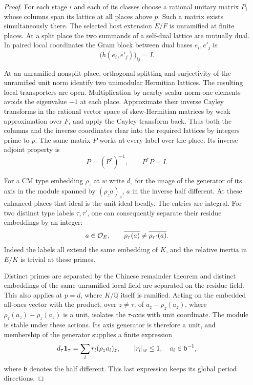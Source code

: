 \begin{proof}

For each stage \(i\) and each of its classes choose a rational
unitary matrix \(P_i\) whose columns span its lattice at all
places above \(p\). Such a matrix exists simultaneously there.
The selected host extension \(E/F\) is unramified at finite places.
At a split place the two summands of a self-dual lattice are
mutually dual.
In paired local coordinates the Gram block between dual bases \(e_i,e'_j\) is
\[
  \big(h(e_i,e'_j)\big)_{ij}=I .
\]

At an unramified nonsplit place, orthogonal
splitting and surjectivity of the unramified unit norm identify
two unimodular Hermitian lattices. The resulting local
transporters are open. Multiplication by nearby scalar norm-one
elements avoids the eigenvalue \(-1\) at each place. Approximate
their inverse Cayley transforms in the rational vector space of
skew-Hermitian matrices by weak approximation over \(F\), and
apply the Cayley transform back. Thus both the columns and the
inverse coordinates clear into the required lattices by
integers prime to \(p\). The same matrix \(P\) works at every label over the place. Its inverse adjoint property is
\[
  P=(P^*)^{-1},\qquad P^*P=I.
\]


For a CM type embedding \(\rho_\tau\) at \(w\) write \(d_\tau\)
for the image of the generator of its axis in the module
spanned by \((\rho_z a)_z\), \(a\) in the inverse half different.
At these enhanced places that ideal is the unit ideal locally.
The entries are integral. For two distinct type labels \(\tau,\tau'\), one can consequently separate their residue embeddings by an integer:
\[
  a\in{\cal O}_E,\qquad \overline{\rho_\tau(a)}\ne\overline{\rho_{\tau'}(a)}.
\]
 Indeed the labels
all extend the same embedding of \(K\), and the relative inertia
in \(E/K\) is trivial at these primes.

Distinct primes are
separated by the Chinese remainder theorem and distinct
embeddings of the same unramified local field are separated
on the residue field. This also applies at \(p=d\), where
\(K/\mathbb Q\) itself is ramified. Acting on the embedded
all-ones vector with the product, over \(z\ne\tau\), of
\(a_z-\rho_z(a_z)\), where
\(\rho_\tau(a_z)-\rho_z(a_z)\) is a unit, isolates the
\(\tau\)-axis with unit coordinate. The module is stable under
these actions. Its axis generator is therefore a unit, and
membership of the generator supplies a finite expression
\[
 d_\tau {\bf1}_\tau=\sum_l r_l(\rho_z a_l)_z,
 \qquad |r_l|_w\le1,\quad a_l\in\mathfrak b^{-1},
\]
where \(\mathfrak b\) denotes the half different.
This last expression keeps its global period directions.


\end{proof}
